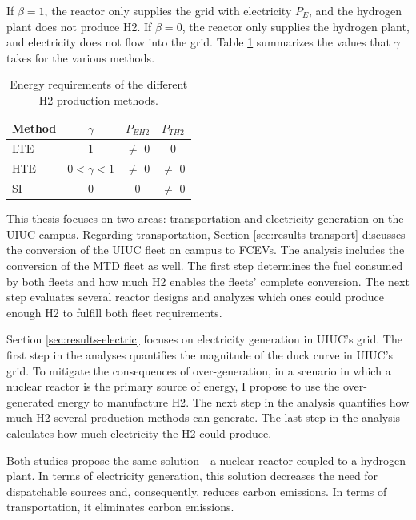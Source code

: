 If $\beta = 1$, the reactor only supplies the grid with electricity $P_E$, and the hydrogen plant does not produce \gls{H2}.
If $\beta = 0$, the reactor only supplies the hydrogen plant, and electricity does not flow into the grid.
Table \ref{tab:cogen1} summarizes the values that $\gamma$ takes for the various methods.

\begin{table}[htbp!]
    \centering
    \caption{Energy requirements of the different \gls{H2} production methods.}
    \begin{tabular}{lccc}
    \toprule
    Method    & $\gamma$         & $P_{EH2}$ & $P_{TH2}$ \\
	\midrule
    LTE & 1                & $\ne$ 0   & 0         \\
    HTE & $0 < \gamma < 1$ & $\ne$ 0   & $\ne$ 0   \\
    SI  & 0                & 0         & $\ne$ 0   \\
    \bottomrule
    \end{tabular}
    \label{tab:cogen1}
\end{table}


This thesis focuses on two areas: transportation and electricity generation on the \gls{UIUC} campus.
Regarding transportation, Section \ref{sec:results-transport} discusses the conversion of the \gls{UIUC} fleet on campus to \glspl{FCEV}.
The analysis includes the conversion of the \gls{MTD} fleet as well.
The first step determines the fuel consumed by both fleets and how much \gls{H2} enables the fleets' complete conversion.
The next step evaluates several reactor designs and analyzes which ones could produce enough \gls{H2} to fulfill both fleet requirements.

Section \ref{sec:results-electric} focuses on electricity generation in UIUC's grid.
The first step in the analyses quantifies the magnitude of the duck curve in UIUC's grid.
To mitigate the consequences of over-generation, in a scenario in which a nuclear reactor is the primary source of energy, I propose to use the over-generated energy to manufacture \gls{H2}.
The next step in the analysis quantifies how much \gls{H2} several production methods can generate.
The last step in the analysis calculates how much electricity the \gls{H2} could produce.

Both studies propose the same solution - a nuclear reactor coupled to a hydrogen plant.
In terms of electricity generation, this solution decreases the need for dispatchable sources and, consequently, reduces carbon emissions.
In terms of transportation, it eliminates carbon emissions.

